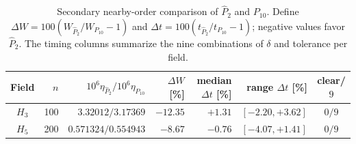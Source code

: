 \begin{table}[htbp]
\centering
\small
\caption{Secondary nearby-order comparison of $\widehat P_2$ and $P_{10}$. Define
$\Delta W=100(W_{\widehat P_2}/W_{P_{10}}-1)$ and
$\Delta t=100(t_{\widehat P_2}/t_{P_{10}}-1)$; negative values favor $\widehat P_2$. The timing columns summarize the nine combinations of $\delta$ and tolerance per field.}
\label{tab:Phat2-P10}
\begin{tabular}{crrrrrc}
\toprule
Field & $n$ & $10^6\eta_{\widehat P_2}/10^6\eta_{P_{10}}$ &
$\Delta W$ [\%] & median $\Delta t$ [\%] & range $\Delta t$ [\%] & clear/$9$\\
\midrule
$H_3$ & 100 & $3.32012/3.17369$ & $-12.35$ & $+1.31$ & $[-2.20,+3.62]$ & $0/9$\\
$H_5$ & 200 & $0.571324/0.554943$ & $-8.67$ & $-0.76$ & $[-4.07,+1.41]$ & $0/9$\\
\bottomrule
\end{tabular}
\end{table}

